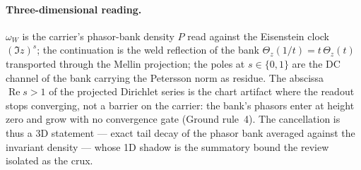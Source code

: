 \documentclass[11pt]{article}
\theoremstyle{definition}
\renewcommand{\Re}{\operatorname{Re}}
\begin{document}
\paragraph{Three-dimensional reading.} $\omega_W$ is the carrier's phasor-bank density $P$ read
against the Eisenstein clock $(\Im z)^s$; the continuation is the weld reflection of the bank
$\Theta_z(1/t)=t\,\Theta_z(t)$ transported through the Mellin projection; the poles at
$s\in\{0,1\}$ are the DC channel of the bank carrying the Petersson norm as residue. The abscissa
$\Re s>1$ of the projected Dirichlet series is the chart artifact where the readout stops
converging, not a barrier on the carrier: the bank's phasors enter at height zero and grow with no
convergence gate (Ground rule~4). The cancellation is thus a 3D statement --- exact tail decay of
the phasor bank averaged against the invariant density --- whose 1D shadow is the summatory
bound the review isolated as the crux.
\end{document}
